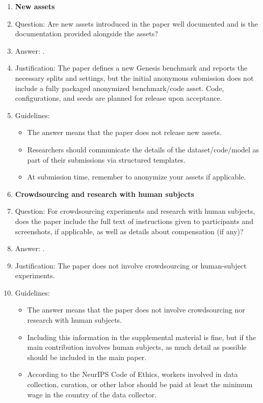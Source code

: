 \begin{enumerate}
\item {\bf New assets}
    \item[] Question: Are new assets introduced in the paper well documented and is the documentation provided alongside the assets?
    \item[] Answer: \answerNo{}.
    \item[] Justification: The paper defines a new Genesis benchmark and reports the necessary splits and settings, but the initial anonymous submission does not include a fully packaged anonymized benchmark/code asset. Code, configurations, and seeds are planned for release upon acceptance.
    \item[] Guidelines:
    \begin{itemize}
        \item The answer \answerNA{} means that the paper does not release new assets.
        \item Researchers should communicate the details of the dataset/code/model as part of their submissions via structured templates.
        \item At submission time, remember to anonymize your assets if applicable.
    \end{itemize}

\item {\bf Crowdsourcing and research with human subjects}
    \item[] Question: For crowdsourcing experiments and research with human subjects, does the paper include the full text of instructions given to participants and screenshots, if applicable, as well as details about compensation (if any)?
    \item[] Answer: \answerNA{}.
    \item[] Justification: The paper does not involve crowdsourcing or human-subject experiments.
    \item[] Guidelines:
    \begin{itemize}
        \item The answer \answerNA{} means that the paper does not involve crowdsourcing nor research with human subjects.
        \item Including this information in the supplemental material is fine, but if the main contribution involves human subjects, as much detail as possible should be included in the main paper.
        \item According to the NeurIPS Code of Ethics, workers involved in data collection, curation, or other labor should be paid at least the minimum wage in the country of the data collector.
    \end{itemize}


\end{enumerate}
